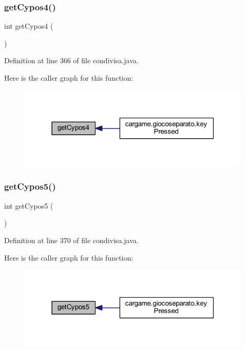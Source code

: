 \subsubsection{\texorpdfstring{get\+Cypos4()}{getCypos4()}}
{\footnotesize\ttfamily int get\+Cypos4 (\begin{DoxyParamCaption}{ }\end{DoxyParamCaption})}



Definition at line 366 of file condivisa.\+java.

Here is the caller graph for this function\+:
\nopagebreak
\begin{figure}[H]
\begin{center}
\leavevmode
\includegraphics[width=316pt]{classcargame_1_1condivisa_a9dd958f70987f67ad2360cefe9266053_icgraph}
\end{center}
\end{figure}
\mbox{\label{classcargame_1_1condivisa_a882afa3a9ce3c5e27c4ab9621ae9c8d8}} 
\subsubsection{\texorpdfstring{get\+Cypos5()}{getCypos5()}}
{\footnotesize\ttfamily int get\+Cypos5 (\begin{DoxyParamCaption}{ }\end{DoxyParamCaption})}



Definition at line 370 of file condivisa.\+java.

Here is the caller graph for this function\+:
\nopagebreak
\begin{figure}[H]
\begin{center}
\leavevmode
\includegraphics[width=316pt]{classcargame_1_1condivisa_a882afa3a9ce3c5e27c4ab9621ae9c8d8_icgraph}
\end{center}
\end{figure}
\mbox{\label{classcargame_1_1condivisa_ab3d3f2281e778ff0b69ac11dddd092b4}} 

